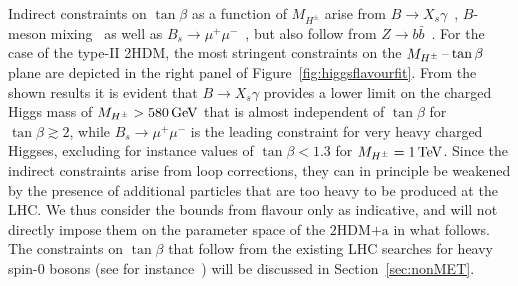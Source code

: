 \documentclass[a4paper, 11pt,notoc]{article}
\newcommand{\hdma}{\ensuremath{\textrm{2HDM+a}}\xspace}
\begin{document}
Indirect constraints on $\tan \beta$ as a function of $M_{H^\pm}$ arise from $B \to X_s \gamma$~\cite{Altmannshofer:2012ks,Hermann:2012fc,Misiak:2015xwa,Misiak:2017bgg}, $B$-meson mixing~\cite{Abbott:1979dt,Geng:1988bq,Buras:1989ui,Kirk:2017juj} as well as  $B_s \to \mu^+ \mu^-$~\cite{Skiba:1992mg,Logan:2000iv,Chankowski:2000ng,Bobeth:2001sq,Bobeth:2013uxa,CMS:2014xfa,Aaij:2017vad}, but also follow from $Z \to b \bar b$~\cite{Denner:1991ie,Haisch:2007ia,Freitas:2012sy}. For the case of the type-II 2HDM, the most stringent constraints on the $M_{H^{\pm}}\hspace{0.5mm}$--$\hspace{0.5mm}\tan \beta$ plane are depicted in the right panel of Figure~\ref{fig:higgsflavourfit}. From the shown results it is evident that $B \to X_s \gamma$ provides a lower limit on the charged Higgs mass of $M_{H^\pm} > 580 \, {\rm GeV}$ that is almost independent of $\tan \beta$ for $\tan \beta \gtrsim 2$, while $B_s \to \mu^+ \mu^-$ is the leading constraint for very heavy charged Higgses, excluding for instance values of $\tan \beta < 1.3$ for $M_{H^\pm} = 1 \, {\rm TeV}$.  Since the  indirect constraints   arise from loop corrections, they can in principle be weakened by the presence of additional particles that are too heavy to be produced at the LHC. We thus consider the bounds from flavour only as indicative, and will not directly impose them on the parameter space of the \hdma in what follows. The constraints on $\tan \beta$ that follow from the existing LHC searches for heavy spin-0 bosons (see for instance~\cite{Aaboud:2017sjh,Sirunyan:2018zut,Aaboud:2017hnm,ATLAS-CONF-2016-104,Sirunyan:2017roi,Aaboud:2018xuw}) will be discussed in Section~\ref{sec:nonMET}.
\end{document}

